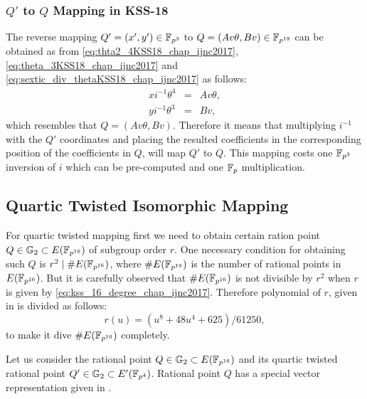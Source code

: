 \subsubsection{\texorpdfstring{$Q'$}{} to \texorpdfstring{$Q$}{} Mapping in KSS-18}
The reverse mapping $Q' =(x',y') \in \mathbb{F}_{p^3}$ to $Q =(Av\theta,Bv) \in \mathbb{F}_{p^{18}}$ can be obtained as from \eqref{eq:thta2_4KSS18_chap_ijnc2017}, \eqref{eq:theta_3KSS18_chap_ijnc2017} and \eqref{eq:sextic_div_thetaKSS18_chap_ijnc2017} as follows:
\begin{subequations}
	\begin{eqnarray}
	x i^{-1}\theta^{4} & = & Av\theta, \nonumber \\
	y i^{-1}\theta^{3} & = & Bv, \nonumber
	\end{eqnarray}
\end{subequations}
which resembles that $Q= (Av\theta, Bv)$. Therefore it means that multiplying $i^{-1}$ with the $Q'$ coordinates and placing the resulted coefficients in the corresponding position of the coefficients in $Q$, will map $Q'$ to $Q$.
This mapping costs one $\mathbb{F}_{p^3}$ inversion of $i$ which can be pre-computed and one ${\mathbb{F}}_{p}$ multiplication.

\subsection{Quartic Twisted Isomorphic Mapping}
\label{sec:ch:ijnc:kss16twist_isomorphicmap}

For quartic twisted mapping first we need to obtain certain ration point  $Q \in {\mathbb{G}}_{2} \subset E(\mathbb{F}_{p^{16}})$ of subgroup order $r$. 
One necessary condition for obtaining such $Q$ is $r^2 \mid \#E(\mathbb{F}_{p^{16}})$, where $\#E(\mathbb{F}_{p^{16}})$ is the number of rational points in $E(\mathbb{F}_{p^{16}})$.  But it is carefully observed that $\#E(\mathbb{F}_{p^{16}})$ is not divisible by $r^2$ when $r$ is given by \eqref{eq:kss_16_degree_chap_ijnc2017}.
Therefore polynomial of $r$, given in \cite{EPRINT:KacSchSco07} is divided as follows:
\begin{equation}
r(u) =  (u^8 +48u^4 +625)/61250,
\end{equation}
to make it dive  $\#E(\mathbb{F}_{p^{16}})$ completely.

Let us consider the rational point $Q \in {\mathbb{G}}_{2} \subset E(\mathbb{F}_{p^{16}})$ and its quartic twisted rational point $Q' \in {\mathbb{G}}_{2} \subset E'(\mathbb{F}_{p^4})$. Rational point $Q$ has a special vector representation given in  .

